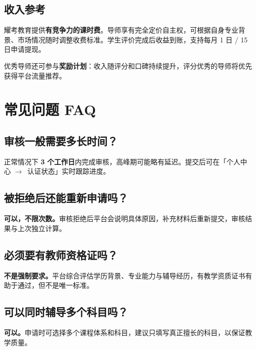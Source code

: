 \documentclass[a4paper,10pt]{article}
\newcommand{\arrowright}{$\rightarrow$}
\begin{document}
\subsection{收入参考}

\begin{goldbox}
耀考教育提供\textbf{有竞争力的课时费}。导师享有完全定价自主权，可根据自身专业背景、市场情况随时调整收费标准。学生评价完成后收益到账，支持每月 1 日 / 15 日申请提现。

优秀导师还可参与\textbf{奖励计划}：收入随评分和口碑持续提升，评分优秀的导师将优先获得平台流量推荐。
\end{goldbox}

\bigskip

\section{常见问题 FAQ}

\setcounter{subsection}{0}
\renewcommand{\thesubsection}{Q\arabic{subsection}}

\subsection{审核一般需要多长时间？}

正常情况下 \textbf{3 个工作日}内完成审核，高峰期可能略有延迟。提交后可在「个人中心 \arrowright\ 认证状态」实时跟踪进度。

\subsection{被拒绝后还能重新申请吗？}

\textbf{可以，不限次数。}审核拒绝后平台会说明具体原因，补充材料后重新提交，审核结果与上次独立计算。

\subsection{必须要有教师资格证吗？}

\textbf{不是强制要求。}平台综合评估学历背景、专业能力与辅导经历，有教学资质证书有助于通过，但不是唯一标准。

\subsection{可以同时辅导多个科目吗？}

\textbf{可以。}申请时可选择多个课程体系和科目，建议只填写真正擅长的科目，以保证教学质量。
\end{document}
